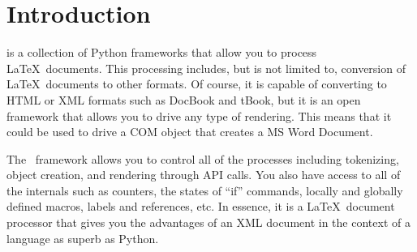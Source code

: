 
\chapter{Introduction}

\plasTeX is a collection of Python frameworks that allow you to process
\LaTeX\ documents.  This processing includes, but is not limited to,
conversion of \LaTeX\ documents to other formats.  Of course, it is 
capable of converting to HTML or XML formats such as DocBook and tBook,
but it is an open framework that allows you to drive any type of 
rendering.  This means that it could be used to drive a COM object 
that creates a MS Word Document.

The \plasTeX\ framework allows you to control all of the 
processes including tokenizing, object creation, and rendering through 
API calls.  You also have access to all of the internals such as
counters, the states of ``if'' commands, locally and globally
defined macros, labels and references, etc.  In essence, it is a \LaTeX\
document processor that gives you the advantages of an XML
document in the context of a language as superb as Python. 

